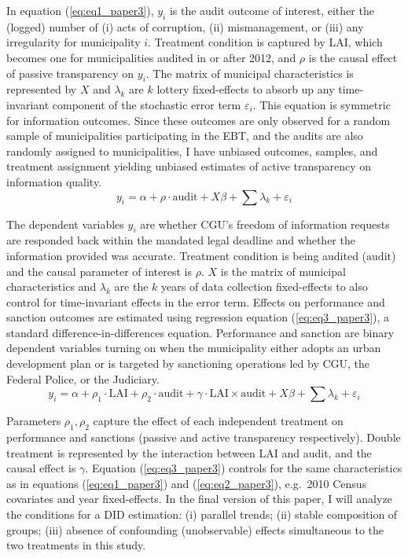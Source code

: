 \documentclass[11pt]{article}
\newcommand{\refp}[1]{(\ref{#1})}
\begin{document}
In equation \refp{eq:eq1_paper3}, $y_{i}$ is the audit outcome of interest, either the (logged) number of (i) acts of corruption, (ii) mismanagement, or (iii) any irregularity for municipality $i$. Treatment condition is captured by $\text{LAI}$, which becomes one for municipalities audited in or after 2012, and $\rho$ is the causal effect of passive transparency on $y_{i}$. The matrix of municipal characteristics is represented by $X$ and $\lambda_{k}$ are $k$ lottery fixed-effects to absorb up any time-invariant component of the stochastic error term $\varepsilon_{i}$. This equation is symmetric for information outcomes. Since these outcomes are only observed for a random sample of municipalities participating in the EBT, and the audits are also randomly assigned to municipalities, I have unbiased outcomes, samples, and treatment assignment yielding unbiased estimates of active transparency on information quality.
\begin{equation} \label{eq:eq2_paper3}
  y_{i} = \alpha + \rho \cdot \text{audit} + X \beta + \sum \lambda_{k} + \varepsilon_{i}
\end{equation}

The dependent variables $y_{i}$ are whether CGU's freedom of information requests are responded back within the mandated legal deadline and whether the information provided was accurate. Treatment condition is being audited ($\text{audit}$) and the causal parameter of interest is $\rho$. $X$ is the matrix of municipal characteristics and $\lambda_{k}$ are the $k$ years of data collection fixed-effects to also control for time-invariant effects in the error term. Effects on performance and sanction outcomes are estimated using regression equation \refp{eq:eq3_paper3}, a standard difference-in-differences equation. Performance and sanction are binary dependent variables turning on when the municipality either adopts an urban development plan or is targeted by sanctioning operations led by CGU, the Federal Police, or the Judiciary.
\begin{equation} \label{eq:eq3_paper3}
  y_{i} = \alpha + \rho_{1} \cdot \text{LAI} + \rho_{2} \cdot \text{audit} + \gamma \cdot \text{LAI} \times \text{audit} + X \beta + \sum \lambda_{k} + \varepsilon_{i}
\end{equation}

Parameters $\rho_{1}, \rho_{2}$ capture the effect of each independent treatment on performance and sanctions (passive and active transparency respectively). Double treatment is represented by the interaction between LAI and audit, and the causal effect is $\gamma$. Equation \refp{eq:eq3_paper3} controls for the same characteristics as in equations \refp{eq:eq1_paper3} and \refp{eq:eq2_paper3}, e.g.~2010 Census covariates and year fixed-effects. In the final version of this paper, I will analyze the conditions for a DID estimation: (i) parallel trends; (ii) stable composition of groups; (iii) absence of confounding (unobservable) effects simultaneous to the two treatments in this study.
\end{document}
